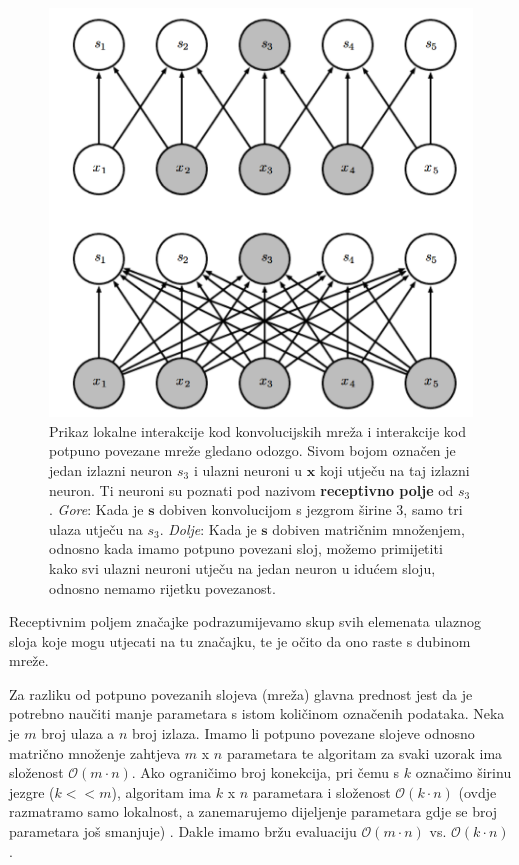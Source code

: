 \documentclass[times, utf8, diplomski]{fer}
\theoremstyle{definition}
\begin{document}
\begin{figure}[!htb]
\centering
\includegraphics[scale=0.25]{lokalna_povetanost_odozgo.png}
\caption{Prikaz lokalne interakcije kod konvolucijskih mreža i interakcije kod potpuno povezane mreže gledano odozgo. Sivom bojom označen je jedan izlazni neuron $s_3$ i ulazni neuroni u $\bm{x}$ koji utječu na taj izlazni neuron. Ti neuroni su poznati pod nazivom \textbf{receptivno polje}  od $s_3$. \textit{Gore}: Kada je $\bm{s}$ dobiven konvolucijom s jezgrom širine 3, samo tri ulaza utječu na $s_3$. \textit{Dolje}: Kada je $\bm{s}$ dobiven matričnim množenjem, odnosno kada imamo potpuno povezani sloj, možemo primijetiti kako svi ulazni neuroni utječu na jedan neuron u idućem sloju, odnosno nemamo rijetku povezanost. }
\end{figure}
Receptivnim poljem značajke podrazumijevamo skup svih elemenata ulaznog sloja koje mogu utjecati na tu značajku, te je očito da ono raste s dubinom mreže.\newline

Za razliku od potpuno povezanih slojeva (mreža) glavna prednost jest da je potrebno naučiti manje parametara s istom količinom označenih podataka. Neka je $m$ broj ulaza a $n$ broj izlaza. Imamo li potpuno povezane slojeve odnosno matrično množenje zahtjeva $m$ x $n$ parametara te algoritam za svaki uzorak ima složenost $\mathcal{O}(m \cdot n)$. Ako ograničimo broj konekcija, pri čemu s $k$ označimo širinu jezgre ($k << m$), algoritam ima $k$ x $n$ parametara i složenost $\mathcal{O}(k \cdot n)$ (ovdje razmatramo samo lokalnost, a zanemarujemo dijeljenje parametara gdje se broj parametara još smanjuje) . Dakle imamo bržu evaluaciju $\mathcal{O}(m\cdot n)$ vs. $\mathcal{O}(k\cdot n)$.
\end{document}
